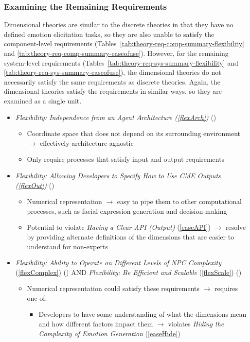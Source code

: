 \subsubsection{Examining the Remaining Requirements}
Dimensional theories are  similar to the discrete theories in that they have no
defined emotion elicitation tasks, so they are also unable to satisfy the
component-level requirements
(Tables~\ref{tab:theory-req-comp-summary-flexibility} and
\ref{tab:theory-req-comp-summary-easeofuse}). However, for the remaining
system-level requirements (Tables~\ref{tab:theory-req-sys-summary-flexibility}
and \ref{tab:theory-req-sys-summary-easeofuse}), the dimensional theories do
not necessarily satisfy the same requirements as discrete theories. Again, the
dimensional theories satisfy the requirements in similar ways, so they are
examined as a single unit.
\begin{itemize}
    \item \textit{Flexibility: Independence from an Agent Architecture
        (\ref{flexArch})} (\good)
    \begin{itemize}
        \item Coordinate space that does not depend on its surrounding
        environment $\rightarrow$ effectively architecture-agnostic

        \item Only require processes that satisfy input and output requirements
    \end{itemize}

    \item \textit{Flexibility: Allowing Developers to Specify How to Use CME
        Outputs (\ref{flexOut})} (\strong)
    \begin{itemize}
        \item Numerical representation $\rightarrow$ easy to pipe them to other
        computational processes, such as facial expression generation and
        decision-making

        \item Potential to violate \textit{Having a Clear API (Output)}
        (\ref{easeAPI}) $\rightarrow$ resolve by providing alternate
        definitions of the dimensions that are easier to understand for
        non-experts
    \end{itemize}

    \item \textit{Flexibility: Ability to Operate on Different Levels of NPC
        Complexity} (\ref{flexComplex}) (\weak) AND \textit{Flexibility: Be
        Efficient and Scalable} (\ref{flexScale})
    (\weak)
    \begin{itemize}
        \item Numerical representation could satisfy these requirements
        $\rightarrow$ requires one of:
        \begin{itemize}
            \item Developers to have some understanding of what the dimensions
            mean and how different factors impact them $\rightarrow$ violates
            \textit{Hiding the Complexity of Emotion Generation}
            (\ref{easeHide})


\end{itemize}
\end{itemize}
\end{itemize}
